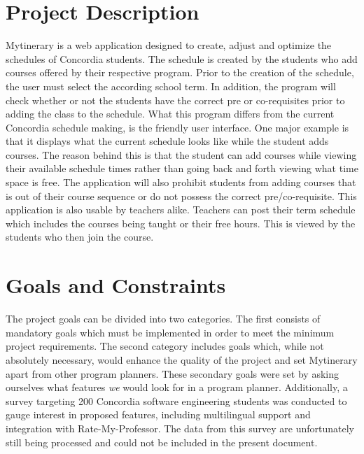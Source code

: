 \documentclass[12pt]{article}
\begin{document}
\section{Project Description}
Mytinerary is a web application designed to create, adjust and optimize the schedules of Concordia students. The schedule is created by the students who add courses offered by their respective program. Prior to the creation of the schedule, the user must select the according school term. In addition, the program will check whether or not the students have the correct pre or co-requisites prior to adding the class to the schedule. What this program differs from the current Concordia schedule making, is the friendly user interface. One major example is that it displays what the current schedule looks like while the student adds courses. The reason behind this is that the student can add courses while viewing their available schedule times rather than going back and forth viewing what time space is free. The application will also prohibit students from adding courses that is out of their course sequence or do not possess the correct pre/co-requisite.
This application is also usable by teachers alike. Teachers can post their term schedule which includes the courses being taught or their free hours. This is viewed by the students who then join the course.

\vfill
\newpage
\section{Goals and Constraints}
The project goals can be divided into two categories. The first consists of
mandatory goals which must be implemented in order to meet the minimum project
requirements. The second category includes goals which, while not absolutely necessary, would
enhance the quality of the project and set Mytinerary apart from other program planners.
These secondary goals were set by asking ourselves what features \emph{we} would look for
in a program planner. Additionally, a survey targeting 200 Concordia software engineering
students was conducted to gauge interest in proposed features, including multilingual
support and integration with Rate-My-Professor. The data from this survey are
unfortunately still being processed and could not be included in the present document.
\end{document}
